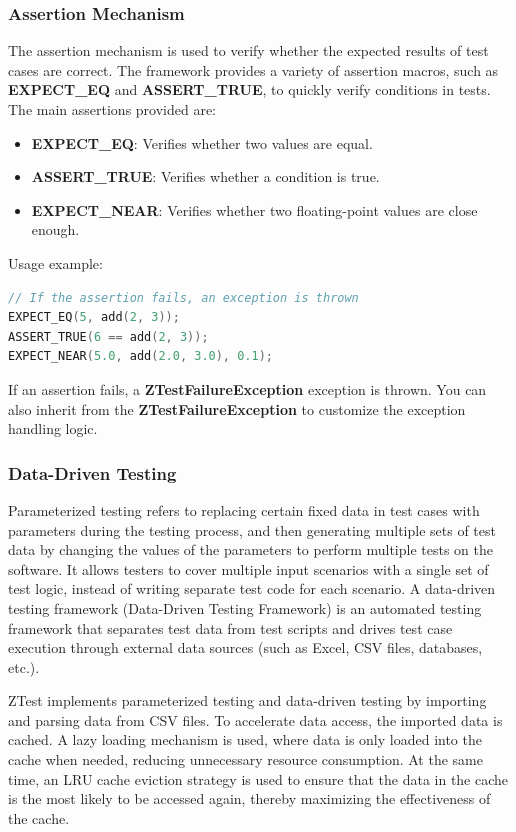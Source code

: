 \documentclass{article}
\begin{document}
\subsubsection{Assertion Mechanism}
The assertion mechanism is used to verify whether the expected results of test cases are correct. The framework provides a variety of assertion macros, such as \textbf{EXPECT\_EQ} and \textbf{ASSERT\_TRUE}, to quickly verify conditions in tests.
The main assertions provided are:
\begin{itemize}
    \item \textbf{EXPECT\_EQ}: Verifies whether two values are equal.
    \item \textbf{ASSERT\_TRUE}: Verifies whether a condition is true.
    \item \textbf{EXPECT\_NEAR}: Verifies whether two floating-point values are close enough.
\end{itemize}
Usage example:
\begin{framed}

    \begin{lstlisting}[language=C++]
// If the assertion fails, an exception is thrown
EXPECT_EQ(5, add(2, 3));
ASSERT_TRUE(6 == add(2, 3));
EXPECT_NEAR(5.0, add(2.0, 3.0), 0.1);
\end{lstlisting}
\end{framed}

If an assertion fails, a \textbf{ZTestFailureException} exception is thrown. You can also inherit from the \textbf{ZTestFailureException} to customize the exception handling logic.
\subsubsection{Data-Driven Testing}
Parameterized testing refers to replacing certain fixed data in test cases with parameters during the testing process, and then generating multiple sets of test data by changing the values of the parameters to perform multiple tests on the software. It allows testers to cover multiple input scenarios with a single set of test logic, instead of writing separate test code for each scenario.
A data-driven testing framework (Data-Driven Testing Framework) is an automated testing framework that separates test data from test scripts and drives test case execution through external data sources (such as Excel, CSV files, databases, etc.).

ZTest implements parameterized testing and data-driven testing by importing and parsing data from CSV files. To accelerate data access, the imported data is cached. A lazy loading mechanism is used, where data is only loaded into the cache when needed, reducing unnecessary resource consumption. At the same time, an LRU cache eviction strategy is used to ensure that the data in the cache is the most likely to be accessed again, thereby maximizing the effectiveness of the cache.
\end{document}
